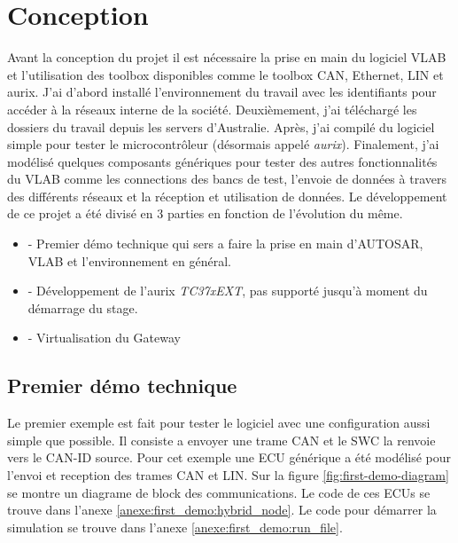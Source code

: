 \section{Conception}

Avant la conception du projet il est nécessaire la prise en main du logiciel VLAB et l'utilisation des toolbox disponibles comme le toolbox CAN, Ethernet, LIN et aurix. J'ai d'abord installé l'environnement du travail avec les identifiants pour accéder à la réseaux interne de la société. Deuxièmement, j'ai téléchargé les dossiers du travail depuis les servers d'Australie. Apr\`es, j'ai compil\'e du logiciel simple pour tester le microcontr\^oleur (désormais appel\'e \textit{aurix}). Finalement, j'ai modélisé quelques composants génériques pour tester des autres fonctionnalités du VLAB comme les connections des bancs de test, l'envoie de données à travers des différents réseaux et la réception et utilisation de données. Le développement de ce projet a \'et\'e divis\'e en 3 parties en fonction de l'évolution du même. 

\begin{itemize} 

    \item - Premier démo technique qui sers a faire la prise en main d'AUTOSAR, VLAB et l'environnement en général. 

    \item - Développement de l'aurix \textit{TC37xEXT}\cite{aurix.tc37e}, pas support\'e jusqu'\`a moment du démarrage du stage. 

    \item - Virtualisation du Gateway 

\end{itemize} 

\subsection{Premier d\'emo technique}

Le premier exemple est fait pour tester le logiciel avec une configuration aussi simple que possible. Il consiste a envoyer une trame CAN et le SWC la renvoie vers le CAN-ID source. Pour cet exemple une ECU générique a \'et\'e modélisé pour l'envoi et reception des trames CAN et LIN. Sur la figure \ref{fig:first-demo-diagram} se montre un diagrame de block des communications. Le code de ces ECUs se trouve dans l'anexe \ref{anexe:first_demo:hybrid_node}. Le code pour démarrer la simulation se trouve dans l'anexe \ref{anexe:first_demo:run_file}. 


